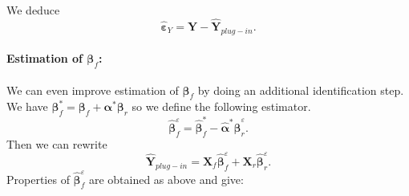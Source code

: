 \documentclass[12pt,a4paper]{report}
\begin{document}
We deduce
\begin{equation}
	\hat{\boldsymbol{\varepsilon}}_Y=\boldsymbol{Y}-\hat{\boldsymbol{Y}}_{plug-in}.
\end{equation}
\paragraph{Estimation of $\boldsymbol{\beta}_f$:}
		We can even improve estimation of $\boldsymbol{\beta}_f$ by doing an additional identification step.	We have $\boldsymbol{\beta}^*_f=\boldsymbol{\beta}_f+\boldsymbol{\alpha}^*\boldsymbol{\beta}_r $ so we define the following estimator.
			\begin{equation}
			\hat{\boldsymbol{\beta}}_f^{\varepsilon}=\hat{\boldsymbol{\beta}}^*_f-\hat{\boldsymbol{\alpha}}^*\hat{\boldsymbol{\beta}}_{r}^{\varepsilon}.
			\end{equation}
	Then we can rewrite 
	\begin{equation}
		\hat{\boldsymbol{Y}}_{plug-in}=\boldsymbol{X}_f\hat{\boldsymbol{\beta}}_f^{\varepsilon}+ \boldsymbol{X}_r \hat{\boldsymbol{\beta}}_{r}^{\varepsilon}.
	\end{equation}
Properties of $\hat{\boldsymbol{\beta}}_f^{\varepsilon}$ are obtained as above and give:
\end{document}
